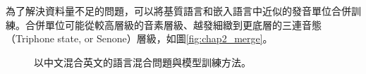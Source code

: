 為了解決資料量不足的問題，可以將基質語言和嵌入語言中近似的發音單位合併訓練。合併單位可能從較高層級的音素層級、越發細緻到更底層的三連音態（Triphone state, or Senone）層級，如圖\ref{fig:chap2_merge}。
\begin{figure}
\centering
{}
\caption{以中文混合英文的語言混合問題與模型訓練方法。}
\end{figure}

